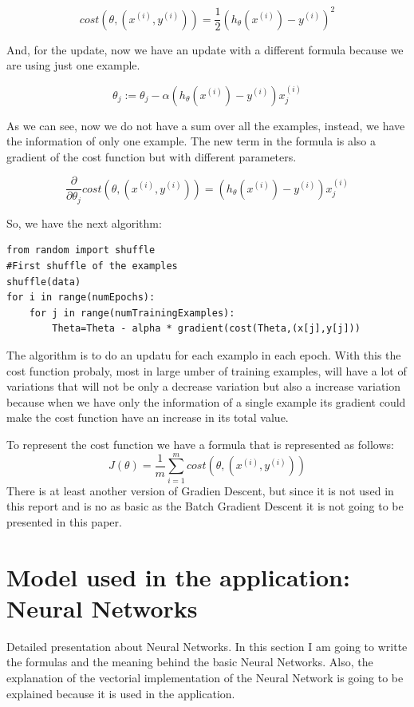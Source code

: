 \documentclass[12pt]{article}
\begin{document}
\begin{equation}
 cost(\theta,(x^{(i)},y^{(i)}))= \frac{1}{2}(h_{\theta}(x^{(i)})-y^{(i)})^2
\end{equation}

And, for the update, now we have an update with a different formula because we are using just one example.

 \begin{equation}
 \theta_{j}:= \theta_{j} - \alpha (h_{\theta}(x^{(i)})-y^{(i)})x_{j}^{(i)}
\end{equation}

As we can see, now we do not have a sum over all the examples, instead, we have the information of only one example. The new term in the formula is also a gradient of the cost function but with different parameters.

\begin{equation}
 \frac{\partial}{\partial\theta_{j}}cost(\theta,(x^{(i)},y^{(i)}))= (h_{\theta}(x^{(i)})-y^{(i)})x_{j}^{(i)}
\end{equation}

So, we have the next algorithm:
\begin{lstlisting}
from random import shuffle
#First shuffle of the examples
shuffle(data)
for i in range(numEpochs):
	for j in range(numTrainingExamples):
		Theta=Theta - alpha * gradient(cost(Theta,(x[j],y[j]))
\end{lstlisting}

The algorithm is to do an updatu for each examplo in each epoch. With this the cost function probaly, most in large umber of training examples, will have a lot of variations that will not be only a decrease variation but also a increase variation because when we have only the information of a single example its gradient could make the cost function have an increase in its total value.

To represent the cost function we have a formula that is represented as follows:
\begin{equation}
  J(\theta)=\frac{1}{m} \displaystyle\sum_{i=1}^{m}cost(\theta,(x^{(i)},y^{(i)}))
\end{equation}
There is at least another version of Gradien Descent, but since it is not used in this report and is no as basic as the Batch Gradient Descent it is not going to be presented in this paper.

\section{Model used in the application: Neural Networks}
Detailed presentation about Neural Networks. In this section I am going to writte the formulas and the meaning behind the basic Neural Networks. Also, the explanation of the vectorial implementation of the Neural Network is going to be explained because it is used in the application.
\end{document}
